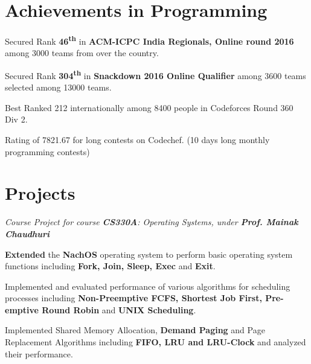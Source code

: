 \documentclass[a4paper]{norm-resume}
\begin{document}

\section{Achievements in Programming \hrulefill}

\vspace{2mm} %

\begin{tightitemize}
    \item Secured Rank \textbf{46\textsuperscript{th}} in \textbf{ACM-ICPC India Regionals, Online round 2016} among 3000 teams from over the country.
    \item Secured Rank \textbf{304\textsuperscript{th}} in \textbf{Snackdown 2016 Online Qualifier} among 3600 teams selected among 13000 teams.
    \item Best Ranked 212 internationally among 8400 people in Codeforces Round 360 Div 2.
	\item Rating of 7821.67 for long contests on Codechef. (10 days long monthly programming contests)
\end{tightitemize}


\section{Projects \hrulefill}


       
    \emph{Course Project for course \textbf{CS330A}: Operating Systems, under \textbf{Prof. Mainak Chaudhuri}}
    \begin{tightitemize}
    \small
    {
    \item \textbf{Extended} the \textbf{NachOS} operating system to perform basic operating system functions including \textbf{Fork, Join, Sleep, Exec} and \textbf{Exit}. 
    \item Implemented and evaluated performance of various algorithms for scheduling processes including \textbf{Non-Preemptive FCFS, Shortest Job First, Pre-emptive Round Robin} and \textbf{UNIX Scheduling}.
    \item Implemented Shared Memory Allocation, \textbf{Demand Paging} and Page Replacement Algorithms including \textbf{FIFO, LRU and LRU-Clock} and analyzed their performance.
    }
    \end{tightitemize}
        
\end{document}
